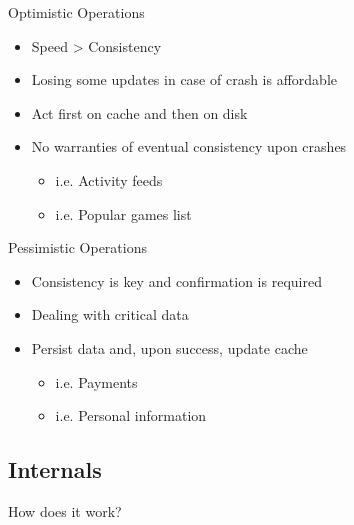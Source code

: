 \documentclass[aspectratio=169]{beamer}
\begin{document}
\begin{frame}{Optimistic Operations}
    \begin{itemize}
        \item Speed > Consistency
        \item Losing some updates in case of crash is affordable
        \item Act first on cache and then on disk
        \item No warranties of eventual consistency upon crashes
            \begin{itemize}
                \item i.e. Activity feeds
                \item i.e. Popular games list
            \end{itemize}
    \end{itemize}
\end{frame}

\begin{frame}{Pessimistic Operations}
    \begin{itemize}
        \item Consistency is key and confirmation is required
        \item Dealing with critical data
        \item Persist data and, upon success, update cache
            \begin{itemize}
                \item i.e. Payments
                \item i.e. Personal information
            \end{itemize}
    \end{itemize}
\end{frame}

\subsection{Internals}
{
\begin{frame}{How does it work?}
\end{frame}
}
\end{document}
